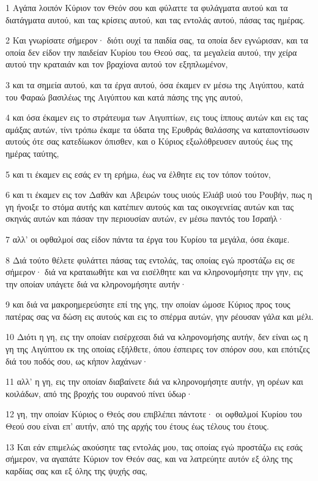 \par 1 Αγάπα λοιπόν Κύριον τον Θεόν σου και φύλαττε τα φυλάγματα αυτού και τα διατάγματα αυτού, και τας κρίσεις αυτού, και τας εντολάς αυτού, πάσας τας ημέρας.
\par 2 Και γνωρίσατε σήμερον· διότι ουχί τα παιδία σας, τα οποία δεν εγνώρισαν, και τα οποία δεν είδον την παιδείαν Κυρίου του Θεού σας, τα μεγαλεία αυτού, την χείρα αυτού την κραταιάν και τον βραχίονα αυτού τον εξηπλωμένον,
\par 3 και τα σημεία αυτού, και τα έργα αυτού, όσα έκαμεν εν μέσω της Αιγύπτου, κατά του Φαραώ βασιλέως της Αιγύπτου και κατά πάσης της γης αυτού,
\par 4 και όσα έκαμεν εις το στράτευμα των Αιγυπτίων, εις τους ίππους αυτών και εις τας αμάξας αυτών, τίνι τρόπω έκαμε τα ύδατα της Ερυθράς θαλάσσης να καταποντίσωσιν αυτούς ότε σας κατεδίωκον όπισθεν, και ο Κύριος εξωλόθρευσεν αυτούς έως της ημέρας ταύτης,
\par 5 και τι έκαμεν εις εσάς εν τη ερήμω, έως να έλθητε εις τον τόπον τούτον,
\par 6 και τι έκαμεν εις τον Δαθάν και Αβειρών τους υιούς Ελιάβ υιού του Ρουβήν, πως η γη ήνοιξε το στόμα αυτής και κατέπιεν αυτούς και τας οικογενείας αυτών και τας σκηνάς αυτών και πάσαν την περιουσίαν αυτών, εν μέσω παντός του Ισραήλ·
\par 7 αλλ' οι οφθαλμοί σας είδον πάντα τα έργα του Κυρίου τα μεγάλα, όσα έκαμε.
\par 8 Διά τούτο θέλετε φυλάττει πάσας τας εντολάς, τας οποίας εγώ προστάζω εις σε σήμερον· διά να κραταιωθήτε και να εισέλθητε και να κληρονομήσητε την γην, εις την οποίαν υπάγετε διά να κληρονομήσητε αυτήν·
\par 9 και διά να μακροημερεύσητε επί της γης, την οποίαν ώμοσε Κύριος προς τους πατέρας σας να δώση εις αυτούς και εις το σπέρμα αυτών, γην ρέουσαν γάλα και μέλι.
\par 10 Διότι η γη, εις την οποίαν εισέρχεσαι διά να κληρονομήσης αυτήν, δεν είναι ως η γη της Αιγύπτου εκ της οποίας εξήλθετε, όπου έσπειρες τον σπόρον σου, και επότιζες διά του ποδός σου, ως κήπον λαχάνων·
\par 11 αλλ' η γη, εις την οποίαν διαβαίνετε διά να κληρονομήσητε αυτήν, γη ορέων και κοιλάδων, από της βροχής του ουρανού πίνει ύδωρ·
\par 12 γη, την οποίαν Κύριος ο Θεός σου επιβλέπει πάντοτε· οι οφθαλμοί Κυρίου του Θεού σου είναι επ' αυτήν, από της αρχής του έτους έως τέλους του έτους.
\par 13 Και εάν επιμελώς ακούσητε τας εντολάς μου, τας οποίας εγώ προστάζω εις εσάς σήμερον, να αγαπάτε Κύριον τον Θεόν σας, και να λατρεύητε αυτόν εξ όλης της καρδίας σας και εξ όλης της ψυχής σας,
